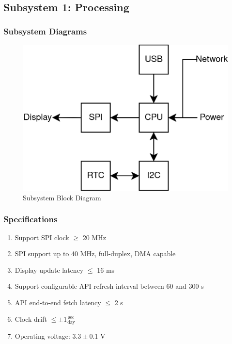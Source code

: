 \subsection{Subsystem 1: Processing}

\subsubsection{Subsystem Diagrams}
\begin{figure}[h]
    \centering
    \includegraphics[width=12cm]{images/Processing_Subsystem_Block_Diagram.png} %
    \caption{Subsystem Block Diagram}
\end{figure} %

\subsubsection{Specifications}
\begin{enumerate}
    \item Support SPI clock $\geq$ 20 MHz
    \item SPI support up to 40 MHz, full-duplex, DMA capable
    \item Display update latency $\leq$ 16 ms
    \item Support configurable API refresh interval between 60 and 300 s
    \item API end-to-end fetch latency $\leq$ 2 s
    \item Clock drift $\leq \pm 1\frac{\text{sec}}{\text{day}}$
    \item Operating voltage: $3.3 \pm 0.1$ V
\end{enumerate}

